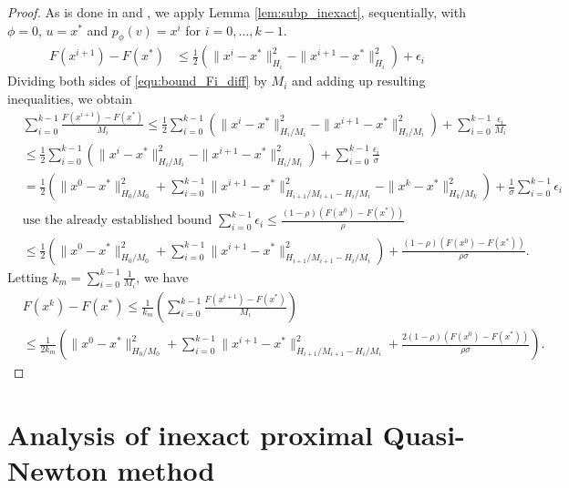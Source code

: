 \documentclass[11pt]{article}
\numberwithin{equation}{section}
\begin{document}
\begin{proof}
    As is done in  \cite{Beck2009} and \cite{Schmidtetal},  we apply Lemma \ref{lem:subp_inexact}, sequentially, with $\phi = 0$, $u=x^*$ and $p_{\phi}(v)=x^i$ for $i=0, \ldots, k-1$. 
    \begin{align}
    	\label{equ:bound_Fi_diff}
        F(x^{i+1}) - F(x^*)
        &\leq 
        \frac{1}{2} \left(\|x^i-x^*\|_{H_{i}}^2 
        - \|x^{i+1}-x^*\|_{H_{i}}^2 \right) 
        + \epsilon_i 
    \end{align}
    Dividing both sides of \eqref{equ:bound_Fi_diff} by $M_i$ and adding up resulting inequalities, we obtain  
    \begin{align*}
        &\sum_{i=0}^{k-1} \frac{F(x^{i+1}) - F(x^*)}{M_i}
        \leq 
        \frac{1}{2} \sum_{i=0}^{k-1} \left(\|x^i-x^*\|_{H_i/M_i}^2 
        - \|x^{i+1}-x^*\|_{H_i/M_i}^2 \right) 
        + \sum_{i=0}^{k-1} \frac{\epsilon_i}{M_i}  \\
        &\leq 
        \frac{1}{2} \sum_{i=0}^{k-1} \left(\|x^i-x^*\|_{H_i/M_i}^2 
        - \|x^{i+1}-x^*\|_{H_i/M_i}^2 \right) 
        + \sum_{i=0}^{k-1} \frac{\epsilon_i}{\sigma}  \\
        &= 
        \frac{1}{2} \left( \|x^0-x^*\|_{H_0/M_0}^2 
        + \sum_{i=0}^{k-1}\|x^{i+1} - x^*\|_{H_{i+1}/M_{i+1}-H_i/M_i}^2 
        - \|x^k-x^*\|_{H_k/M_k}^2 \right) 
        + \frac{1}{\sigma}\sum_{i=0}^{k-1}\epsilon_i \\
        &\mbox{use the already established bound $\sum_{i=0}^{k-1}\epsilon_i \leq \frac{(1-\rho)(F(x^0)-F(x^*))}{\rho}$}\\
        &\leq 
        \frac{1}{2} \left( \|x^0-x^*\|_{H_0/M_0}^2 
        + \sum_{i=0}^{k-1}\|x^{i+1} - x^*\|_{H_{i+1}/M_{i+1}-H_i/M_i}^2 \right) 
        + \frac{(1-\rho)(F(x^0)-F(x^*))}{\rho\sigma} .
    \end{align*}
    Letting $k_m = \sum_{i=0}^{k-1} \frac{1}{M_i}$, we have
    \begin{align*}
        &F(x^k) - F(x^*) \leq \frac{1}{k_m}( \sum_{i=0}^{k-1} \frac{F(x^{i+1}) - F(x^*)}{M_i} )\\        
        &\leq \frac{1}{2k_m}  \left( \|x^0-x^*\|_{H_0/M_0}^2 
        + \sum_{i=0}^{k-1}\|x^{i+1} - x^*\|_{H_{i+1}/M_{i+1}-H_i/M_i}^2 
        + \frac{2(1-\rho)(F(x^0)-F(x^*))}{\rho\sigma}\right) .
    \end{align*}
\end{proof}

\section{Analysis of inexact proximal Quasi-Newton method} %
\label{sec:conv_inexact}
\end{document}
